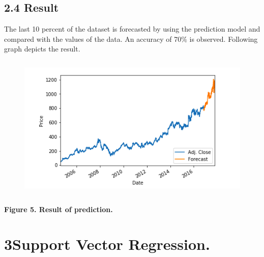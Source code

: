 \documentclass[12pt]{article}
\begin{document}
\vspace{\baselineskip}

\vspace{\baselineskip}
\subsection*{2.4 Result }

\vspace{\baselineskip}
The last 10 percent of the dataset is forecasted by using the prediction model and compared with the values of the data. An accuracy of 70$\%$  is observed. Following graph depicts the result.\par


\vspace{\baselineskip}



\begin{figure}[H]
	\begin{Center}
		\includegraphics[width=4.88in,height=2.73in]{./media/image4.png}
	\end{Center}
\end{figure}



\par

\begin{Center}
\textbf{Figure 5. Result of prediction.}
\end{Center}\par

\section*{3\hspace*{10pt}Support Vector Regression.}
\end{document}
